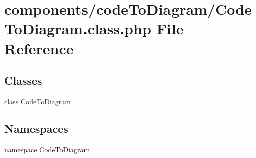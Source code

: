 \hypertarget{_code_to_diagram_8class_8php}{
\section{components/codeToDiagram/CodeToDiagram.class.php File Reference}
\label{_code_to_diagram_8class_8php}
}
\subsection*{Classes}
\begin{CompactItemize}
\item 
class \hyperlink{class_code_to_diagram}{CodeToDiagram}
\end{CompactItemize}
\subsection*{Namespaces}
\begin{CompactItemize}
\item 
namespace \hyperlink{namespace_code_to_diagram}{CodeToDiagram}
\end{CompactItemize}
